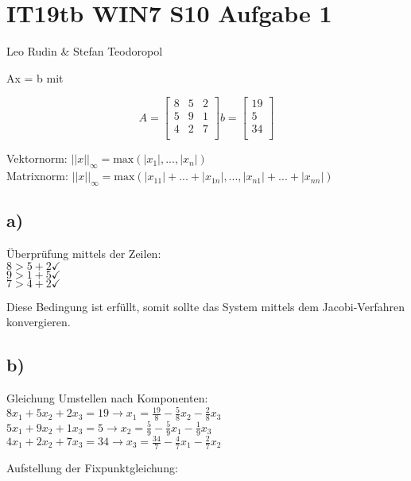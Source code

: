 \documentclass{article}
\begin{document}
\section*{IT19tb WIN7 S10 Aufgabe 1}
Leo Rudin \& Stefan Teodoropol

Ax = b mit

\[
A =
\begin{bmatrix} 
8 & 5 & 2 \\
5 & 9 & 1 \\
4 & 2 & 7 \\
\end{bmatrix}
b =
\begin{bmatrix} 
19 \\
5 \\
34 \\
\end{bmatrix}
\]

Vektornorm: \(||x||_\infty = \text{max}(|x_1|,...,|x_n|)\)\\
Matrixnorm: \(||x||_\infty = \text{max}(|x_{11}|+...+|x_{1n}|,...,|x_{n1}|+...+|x_{nn}|)\)

\subsection*{a)}

Überprüfung mittels der Zeilen:\\
\(8 > 5 + 2 \checkmark\)\\
\(9 > 1 + 5 \checkmark\)\\
\(7 > 4 + 2 \checkmark\)

Diese Bedingung ist erfüllt, somit sollte das System mittels dem Jacobi-Verfahren konvergieren.

\newpage
\subsection*{b)}

Gleichung Umstellen nach Komponenten:\\
\(8x_1 + 5x_2 + 2x_3 = 19 \rightarrow x_1 = \frac{19}{8} - \frac{5}{8}x_2 - \frac{2}{8}x_3\)\\
\(5x_1 + 9x_2 + 1x_3 = 5 \rightarrow x_2 = \frac{5}{9} - \frac{5}{9}x_1 - \frac{1}{9}x_3\)\\
\(4x_1 + 2x_2 + 7x_3 = 34 \rightarrow x_3 = \frac{34}{7} - \frac{4}{7}x_1 - \frac{2}{7}x_2\)

\vspace{5mm}

Aufstellung der Fixpunktgleichung:
\end{document}

